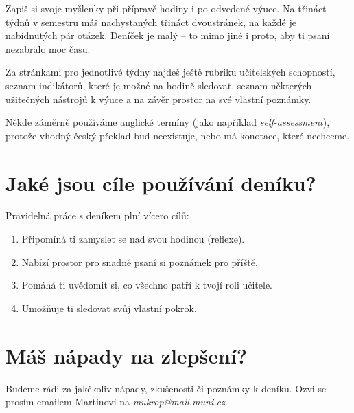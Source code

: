 Zapiš si svoje myšlenky při přípravě hodiny i po odvedené výuce. Na třináct týdnů v semestru máš nachystaných třináct dvoustránek, na každé je nabídnutých pár otázek. Deníček je malý -- to mimo jiné i proto, aby ti psaní nezabralo moc času.

Za stránkami pro jednotlivé týdny najdeš ještě rubriku učitelských schopností, seznam indikátorů, které je možné na hodině sledovat, seznam některých užitečných nástrojů k výuce a na závěr prostor na své vlastní poznámky.

Někde záměrně používáme anglické termíny (jako například \textit{self-assessment}), protože vhodný český překlad buď neexistuje, nebo má konotace, které nechceme.

\section*{Jaké jsou cíle používání deníku?}

Pravidelná práce s deníkem plní vícero cílů:
\begin{enumerate}[topsep=0pt]
\item Připomíná ti zamyslet se nad svou hodinou (reflexe).
\item Nabízí prostor pro snadné psaní si poznámek pro příště.
\item Pomáhá ti uvědomit si, co všechno patří k tvojí roli učitele.
\item Umožňuje ti sledovat svůj vlastní pokrok.
\end{enumerate}

\section*{Máš nápady na zlepšení?}

Budeme rádi za jakékoliv nápady, zkušenosti či poznámky k deníku. Ozvi se prosím emailem Martinovi na \textit{mukrop@mail.muni.cz}.
